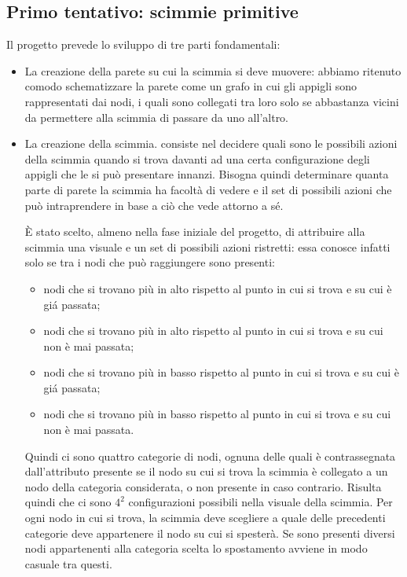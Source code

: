 \documentclass{article}
\begin{document}
	\subsection{Primo tentativo: scimmie primitive}
	Il progetto prevede lo sviluppo di tre parti fondamentali:
	\begin{itemize}
	\item La creazione della parete su cui la scimmia si deve muovere: abbiamo ritenuto comodo schematizzare la parete come un grafo in cui gli appigli sono rappresentati dai nodi, i quali sono collegati tra loro solo se abbastanza vicini da permettere alla scimmia di passare da uno all'altro.
	\item La creazione della scimmia. consiste nel decidere quali sono le possibili azioni della scimmia quando si trova davanti ad una certa configurazione degli appigli che le si pu\`{o} presentare innanzi. Bisogna quindi determinare quanta parte di parete la scimmia ha facolt\`{a} di vedere e il set di possibili azioni che pu\`{o} intraprendere in base a ci\`{o} che vede attorno a s\'{e}. 

	\`{E} stato scelto, almeno nella fase iniziale del progetto, di attribuire alla scimmia una visuale e un set di possibili azioni ristretti: essa conosce infatti solo se tra i nodi che pu\`{o} raggiungere sono presenti:
	\begin{itemize}
		\item nodi che si trovano pi\`{u} in alto rispetto al punto in cui si trova e su cui \`{e} gi\'{a} passata;
		\item nodi che si trovano pi\`{u} in alto rispetto al punto in cui si trova e su cui non \`{e} mai passata;
		\item nodi che si trovano pi\`{u} in basso rispetto al punto in cui si trova e su cui \`{e} gi\'{a} passata;
		\item nodi che si trovano pi\`{u} in basso rispetto al punto in cui si trova e su cui non \`{e} mai passata.
	\end{itemize}

Quindi ci sono quattro categorie di nodi, ognuna delle quali \`{e} contrassegnata dall'attributo presente se il nodo su cui si trova la scimmia \`{e} collegato a un nodo della categoria considerata, o non presente in caso contrario.
Risulta quindi che ci sono $4^2$ configurazioni possibili nella visuale della scimmia.
Per ogni nodo in cui si trova, la scimmia deve scegliere a quale delle precedenti categorie deve appartenere il nodo su cui si spester\`{a}. Se sono presenti diversi nodi appartenenti alla categoria scelta lo spostamento avviene in modo casuale tra questi.


\end{itemize}
\end{document}
